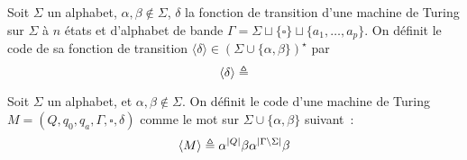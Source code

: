 \begin{definition}
  Soit $\Sigma$ un alphabet, $\alpha,\beta\notin\Sigma$, $\delta$ la fonction de
  transition d'une machine de Turing sur $\Sigma$ à $n$ états et d'alphabet de
  bande
  $\Gamma = \Sigma\sqcup\{\square\}\sqcup\{a_1,\ldots,a_p\}$. On définit le
  code de sa fonction de transition
  $\langle\delta\rangle\in(\Sigma\cup\{\alpha,\beta\})^\star$ par
  \[\langle\delta\rangle\triangleq\]
\end{definition}

\begin{definition}
  Soit $\Sigma$ un alphabet, et $\alpha,\beta\notin \Sigma$. On définit le code
  d'une machine de Turing $M = (Q,q_0,q_a,\Gamma,\square,\delta)$ comme le mot
  sur $\Sigma\cup\{\alpha,\beta\}$ suivant~:
  \[\langle M\rangle \triangleq \alpha^{|Q|}\beta\alpha^{|\Gamma\setminus \Sigma|}\beta
  \]
\end{definition}
